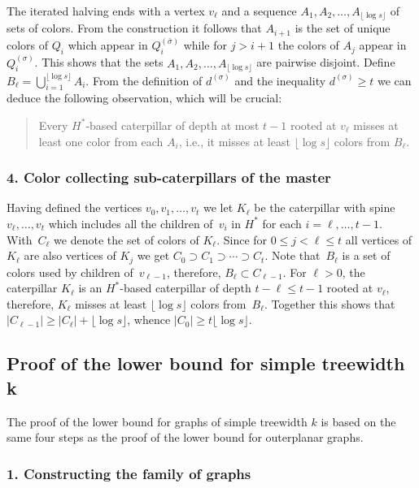 The iterated halving ends with a vertex $v_\ell$ and a sequence
$A_1,A_2,\ldots,A_{\lfloor\log s\rfloor}$ of sets of colors. From the construction it follows that
$A_{i+1}$ is the set of unique colors of $Q_i$ which appear in
$Q_i^{(\bar{\sigma})}$ while for $j>i+1$ the colors of $A_j$ appear in
$Q_i^{(\sigma)}$. This shows that the sets $A_1,A_2,\ldots,A_{\lfloor\log s\rfloor}$ are pairwise
disjoint. Define $B_\ell=\bigcup_{i=1}^{\lfloor\log s\rfloor}A_i$. From the definition of
$d^{(\sigma)}$ and the inequality $d^{(\sigma)}\geq t$ we can deduce the following
observation, which will be crucial:
\begin{quote}
  Every $H^*$-based caterpillar of depth at most ${t-1}$ rooted at $v_\ell$
  misses at least one color from each $A_i$, i.e., it misses at least
  $\lfloor\log s\rfloor$ colors from $B_\ell$.
\end{quote}

\subsubsection*{4.  Color collecting sub-caterpillars of the master}\hfill

Having defined the vertices $v_0,v_1,\ldots,v_{t}$ we let $K_\ell$ be the
caterpillar with spine $v_\ell,\ldots,v_{t}$ which includes all the children
of~$v_i$ in $H^*$ for each $i=\ell,\ldots,{t-1}$.  With~$C_\ell$ we denote the
set of colors of $K_\ell$.  Since for $0\leq j<\ell\leq t$ all vertices of
$K_\ell$ are also vertices of $K_j$ we get
$C_0\supset C_1\supset\cdots\supset C_t$.  Note that~$B_{\ell}$ is a set of
colors used by children of~$v_{\ell-1}$, therefore,
$B_\ell\subset C_{\ell-1}$.  For $\ell>0$, the caterpillar $K_\ell$ is an
$H^*$-based caterpillar of depth $t- \ell \leq {t-1}$ rooted at $v_\ell$,
therefore, $K_\ell$ misses at least $\lfloor\log s\rfloor$ colors from~$B_\ell$. Together
this shows that $|C_{\ell-1}| \geq |C_\ell|+\lfloor\log s\rfloor$, whence $|C_0|\geq t\lfloor\log s\rfloor$.

\subsection{Proof of the lower bound for simple treewidth k}\hfill
\label{sec:simple-k-low}

The proof of the lower bound for graphs of simple treewidth $k$ is based on the
same four steps as the proof of the lower bound for outerplanar graphs.

\subsubsection*{1.  Constructing the family of graphs}\hfill

